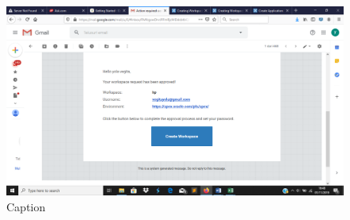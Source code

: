 \begin{enumerate}
    \begin{figure}[!htbp]
        \centering
        \includegraphics[scale=0.3]{figure/9.png}
        \caption{Caption}
        \label{fig:my_label}
    \end{figure}{}
\end{enumerate}


